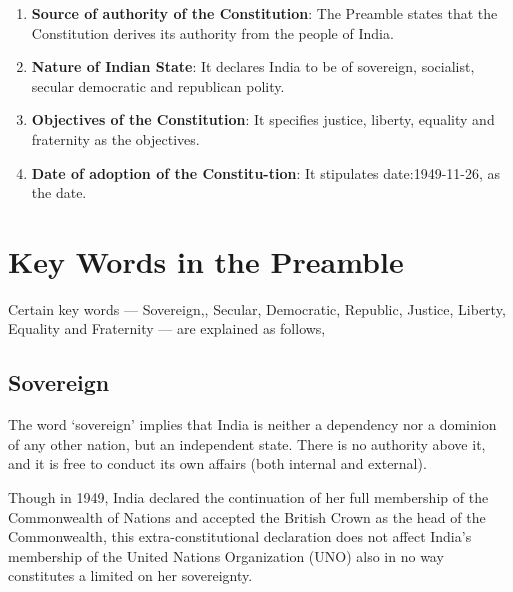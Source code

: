 \begin{multicols}{2}
\begin{enumerate}
  \item \textbf{Source of authority of the Constitution}: The Preamble states that the Constitution derives its authority from the people of India.
  \item \textbf{Nature of Indian State}: It declares India to be of sovereign, socialist, secular democratic and republican polity.
  \item \textbf{Objectives of the Constitution}: It specifies justice, liberty, equality and fraternity as the objectives.
  \item \textbf{Date of adoption of the Constitu-tion}: It stipulates \gls{date:1949-11-26}, as the date.
\end{enumerate}


\section{Key Words in the Preamble}
Certain key words — Sovereign,, Secular, Democratic, Republic, Justice, Liberty, Equality and Fraternity — are explained as follows,

\subsection{Sovereign}
The word `sovereign' implies that India is neither a dependency nor a dominion of any other nation, but an independent state. There is no authority above it, and it is free to conduct its own affairs (both internal and external).

Though in 1949, India declared the continuation of her full membership of the Commonwealth of Nations and accepted the British Crown as the head of the Commonwealth, this extra-constitutional declaration does not affect India's membership of the United Nations Organization (UNO) also in no way constitutes a limited on her sovereignty.


\end{multicols}
